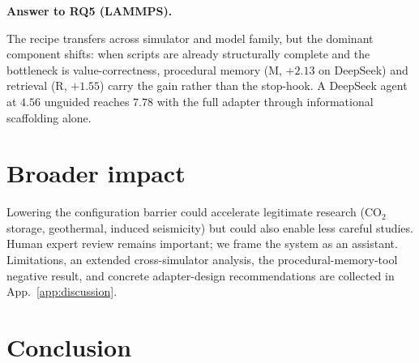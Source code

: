 \documentclass{article}
\newif\ifrqfancy
\newenvironment{rqanswer}[1]{%
  \ifrqfancy\begin{rqbox}\fi\noindent\textbf{Answer to #1.}\ %
}{%
  \ifrqfancy\end{rqbox}\else\par\smallskip\fi%
}
\begin{document}
\begin{rqanswer}{RQ5 (LAMMPS)}
The recipe transfers across simulator and model family, but the dominant component shifts: when scripts are already structurally complete and the bottleneck is value-correctness, procedural memory ($\mathrm{M}$, $+2.13$ on DeepSeek) and retrieval ($\mathrm{R}$, $+1.55$) carry the gain rather than the stop-hook. A DeepSeek agent at $4.56$ unguided reaches $7.78$ with the full adapter through informational scaffolding alone.
\end{rqanswer}


\section{Broader impact}
\label{sec:discussion}
\label{sec:analysis}

Lowering the configuration barrier could accelerate legitimate research (CO$_2$ storage, geothermal, induced seismicity) but could also enable less careful studies. Human expert review remains important; we frame the system as an assistant. Limitations, an extended cross-simulator analysis, the procedural-memory-tool negative result, and concrete adapter-design recommendations are collected in App.~\ref{app:discussion}.


\section{Conclusion}
\label{sec:conclusion}
\end{document}
